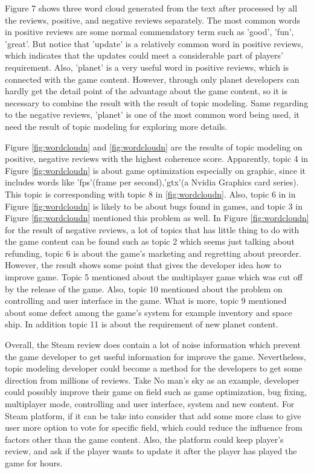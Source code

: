 \documentclass[12pt]{article}
\begin{document}
Figure 7 shows three word cloud generated from the text after processed by all the reviews, positive, and negative reviews separately. The most common words in positive reviews are some normal commendatory term such as 'good', 'fun', 'great'. But notice that 'update' is a relatively common word in positive reviews, which indicates that the updates could meet a considerable part of players' requirement. Also, 'planet' is a very useful word in positive reviews, which is connected with the game content. However, through only planet developers can hardly get the detail point of the advantage about the game content, so it is necessary to combine the result with the result of topic modeling. Same regarding to the negative reviews, 'planet' is one of the most common word being used, it need the result of topic modeling for exploring more details. 

Figure \ref{fig:wordcloudn} and \ref{fig:wordcloudn} are the results of topic modeling on positive, negative reviews with the highest coherence score. Apparently, topic 4 in Figure \ref{fig:wordcloudn} is about game optimization especially on graphic, since it includes words like 'fps'(frame per second),'gtx'(a Nvidia Graphics card series). This topic is corresponding with topic 8 in \ref{fig:wordcloudn}. Also, topic 6 in in Figure \ref{fig:wordcloudn} is likely to be about bugs found in games, and topic 3 in Figure \ref{fig:wordcloudn} mentioned this problem as well. In Figure \ref{fig:wordcloudn} for the result of negative reviews, a lot of topics that has little thing to do with the game content can be found such as topic 2 which seems just talking about refunding, topic 6 is about the game's marketing and regretting about preorder. However, the result shows some point that gives the developer idea how to improve game. Topic 5 mentioned about the multiplayer game which was cut off by the release of the game. Also, topic 10 mentioned about the problem on controlling and user interface in the game. What is more, topic 9 mentioned about some defect among the game's system for example inventory and space ship. In addition topic 11 is about the requirement of new planet content.

Overall, the Steam review does contain a lot of noise information which prevent the game developer to get useful information for improve the game. Nevertheless, topic modeling developer could become a method for the developers to get some direction from millions of reviews. Take No man's sky as an example, developer could possibly improve their game on field such as game optimization, bug fixing, multiplayer mode, controlling and user interface, system and new content. For Steam platform, if it can be take into consider that add some more class to give user more option to vote for specific field, which could reduce the influence from factors other than the game content. Also, the platform could keep player's review, and ask if the player wants to update it after the player has played the game for hours.
\end{document}
